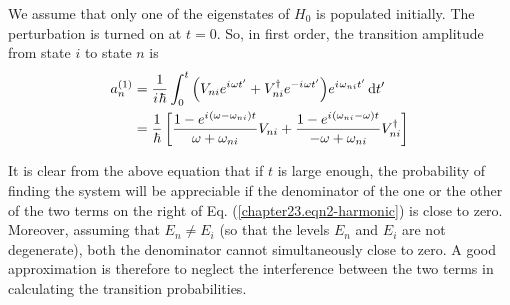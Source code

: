 We assume that only one of the eigenstates of $H_0$ is populated initially. The perturbation is turned on at $t=0$. So, in first order, the transition amplitude from state $i$ to state $n$ is
\begin{align}
	a_n^{(1)} 
	&= \frac{1}{{i\mkern1mu}\hbar} \int_{0}^{t} \qty(V_{n i} e^{{i\mkern1mu} \omega t^\prime} + V_{n i}^\dagger e^{-{i\mkern1mu} \omega t^\prime}) e^{{i\mkern1mu} \omega_{n i} t^\prime} \dd{t^\prime} \nonumber\\
	\label{chapter23.eqn2-harmonic}
	&= \frac{1}{\hbar} \left[\frac{1 - e^{{i\mkern1mu}(\omega - \omega_{n i})t}}{\omega + \omega_{n i}} V_{n i} 
	+ \frac{1 - e^{{i\mkern1mu}(\omega_{n i} - \omega )t}}{-\omega + \omega_{n i}} V_{n i}^\dagger\right]
\end{align}

It is clear from the above equation that if $t$ is large enough, the probability of finding the system will be appreciable if the denominator of the one or the other of the two terms on the right of Eq. (\ref{chapter23.eqn2-harmonic}) is close to zero. Moreover, assuming that $E_n \neq E_i$ (so that the levels $E_n$ and $E_i$ are not degenerate), both the denominator cannot simultaneously close to zero. A good approximation is therefore to neglect the interference between the two terms in calculating the transition probabilities.
